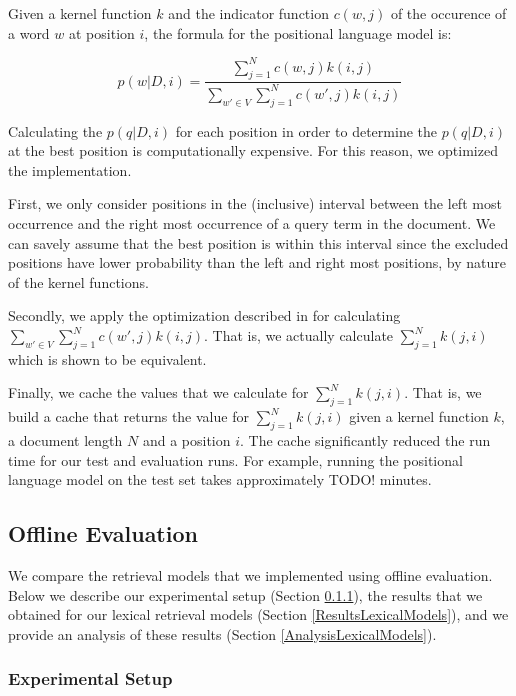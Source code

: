Given a kernel function $k$ and the indicator function 
$c(w,j)$ of the occurence of a word $w$ at position $i$,
the formula for the positional language model is:

\begin{equation*}
p(w|D,i) = \frac{\sum_{j=1}^N c(w,j)k(i,j)}
{\sum_{w' \in V} \sum_{j=1}^N c(w',j)k(i,j)} 
\end{equation*}

Calculating the $p(q|D,i)$ for each position
in order to determine the $p(q|D,i)$ at the 
best position is computationally expensive.
For this reason, we optimized the implementation.

First, we only consider positions in the (inclusive) interval
between the left most occurrence and the right most
occurrence of a query term in the document.
We can savely assume that the best position is within this interval
since the excluded positions have lower probability
than the left and right most positions,
by nature of the kernel functions.

Secondly, we apply the optimization 
described in \cite{PLM} for calculating
$\sum_{w' \in V} \sum_{j=1}^N c(w',j)k(i,j)$.
That is, we actually calculate 
$\sum_{j=1}^N k(j,i)$ which is shown to be equivalent.

Finally, we cache the values that we calculate for 
$\sum_{j=1}^N k(j,i)$. That is,
we build a cache that returns the
value for $\sum_{j=1}^N k(j,i)$ given
a kernel function $k$, a document length $N$
and a position $i$. The cache
significantly reduced the run time
for our test and evaluation runs.
For example, running the positional
language model on the test set takes
approximately TODO! minutes.


\subsection{Offline Evaluation}
\label{LexicalModels:Evaluation}

We compare the retrieval models that we implemented
using offline evaluation. Below we describe
our experimental setup (Section \ref{ExperimentalSetup}), 
the results that we obtained for our lexical retrieval models 
(Section \ref{ResultsLexicalModels}), 
and we provide an analysis of these results 
(Section \ref{AnalysisLexicalModels}).

\subsubsection{Experimental Setup}
\label{ExperimentalSetup}

